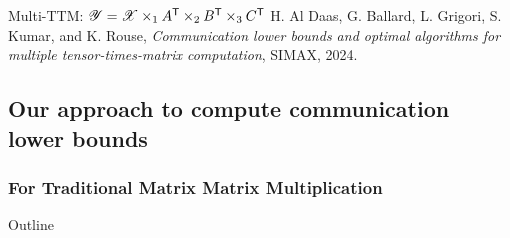 \documentclass[aspectratio=169]{beamer}
\newcommand{\X}{\T{X}}
\newcommand{\Y}{\T{Y}}
\begin{document}
\begin{frame}{Multi-TTM: $\Y = \X \times_1 A^\Tra \times_2 B^\Tra \times_3 C^\Tra$}
	\vfill
	{\footnotesize H. Al Daas, G. Ballard, L. Grigori, S. Kumar, and K. Rouse, \emph{Communication lower bounds and optimal algorithms
			for multiple tensor-times-matrix computation}, SIMAX, 2024.}
\end{frame}

\subsection{Our approach to compute communication lower bounds}
\subsubsection{For Traditional Matrix Matrix Multiplication}
\begin{frame}{Outline}
	\tableofcontents[currentsubsection]
\end{frame}
\end{document}

